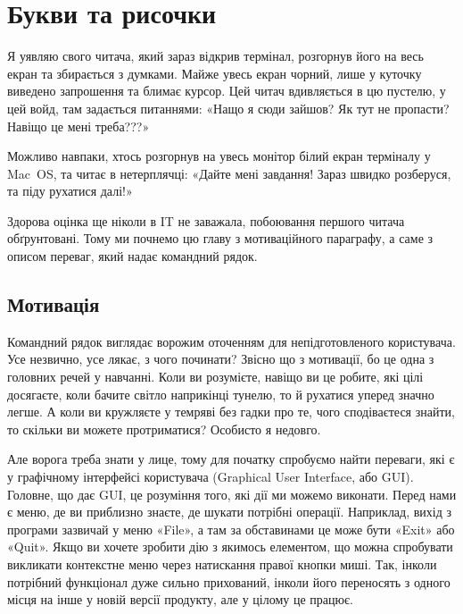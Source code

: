 \chapter{Букви та рисочки}

Я уявляю свого читача, який зараз відкрив термінал, розгорнув його на весь екран та збирається з думками.
Майже увесь екран чорний, лише у куточку виведено запрошення та блимає курсор.
Цей читач вдивляється в цю пустелю, у цей войд, там задається питаннями:
«Нащо я сюди зайшов?
Як тут не пропасти?
Навіщо це мені треба???»

Можливо навпаки, хтось розгорнув на увесь монітор білий екран терміналу у Mac~OS, та читає в нетерплячці:
«Дайте мені завдання!
Зараз швидко розберуся, та піду рухатися далі!»

Здорова оцінка ще ніколи в IT не заважала, побоювання першого читача обґрунтовані.
Тому ми почнемо цю главу з мотиваційного параграфу, а саме з описом переваг, який надає командний рядок.

\vfill
\pagebreak

\section{Мотивація}

Командний рядок виглядає ворожим оточенням для непідготовленого користувача.
Усе незвично, усе лякає, з чого починати?
Звісно що з мотивації, бо це одна з головних речей у навчанні.
Коли ви розумієте, навіщо ви це робите, які цілі досягаєте, коли бачите світло наприкінці тунелю, то й рухатися уперед значно легше.
А коли ви кружляєте у темряві без гадки про те, чого сподіваєтеся знайти, то скільки ви можете протриматися?
Особисто я недовго.

Але ворога треба знати у лице, тому для початку спробуємо найти переваги, які є у графічному інтерфейсі користувача (Graphical User Interface, або GUI).
Головне, що дає GUI, це розуміння того, які дії ми можемо виконати.
Перед нами є меню, де ви приблизно знаєте, де шукати потрібні операції.
Наприклад, вихід з програми зазвичай у меню «File», а там за обставинами це може бути «Exit» або «Quit».
Якщо ви хочете зробити дію з якимось елементом, що можна спробувати викликати контекстне меню через натискання правої кнопки миші.
Так, інколи потрібний функціонал дуже сильно прихований, інколи його переносять з одного місця на інше у новій версії продукту, але у цілому це працює.

